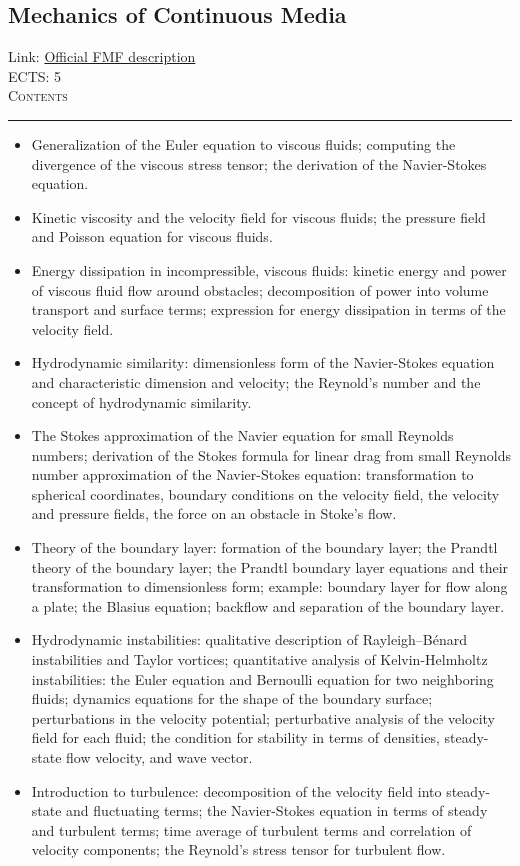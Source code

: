 \documentclass[11pt, a4paper]{article}
\newenvironment{course}[3]{
\subsection{#1}%
Link: \href{#2}{Official FMF description}\\%
ECTS: #3%
\vspace{1ex}
\\
{\large \textsc{Contents}}\\[-0.9ex]%
\rule{\textwidth}{0.5pt}
\vspace{-3ex}
}
{}
\newenvironment{chapter}[1]{
\begin{tcolorbox}[title=#1, breakable]
}
{\end{tcolorbox}}
\begin{document}
\begin{course}{Mechanics of Continuous Media}{https://www.fmf.uni-lj.si/en/study-physics/programmes/1fiz/2020/7000777/courses/1160/}{5}
\begin{chapter}{Mechanics of viscous fluids}
\begin{itemize}
            \item Generalization of the Euler equation to viscous fluids; computing the divergence of the viscous stress tensor; the derivation of the Navier-Stokes equation.

            \item Kinetic viscosity and the velocity field for viscous fluids; the pressure field and Poisson equation for viscous fluids.

            \item Energy dissipation in incompressible, viscous fluids: kinetic energy and power of viscous fluid flow around obstacles; decomposition of power into volume transport and surface terms; expression for energy dissipation in terms of the velocity field.

            \item Hydrodynamic similarity: dimensionless form of the Navier-Stokes equation and characteristic dimension and velocity; the Reynold's number and the concept of hydrodynamic similarity.

            \item The Stokes approximation of the Navier equation for small Reynolds numbers; derivation of the Stokes formula for linear drag from small Reynolds number approximation of the Navier-Stokes equation: transformation to spherical coordinates, boundary conditions on the velocity field, the velocity and pressure fields, the force on an obstacle in Stoke's flow.

            \item Theory of the boundary layer: formation of the boundary layer; the Prandtl theory of the boundary layer; the Prandtl boundary layer equations and their transformation to dimensionless form; example: boundary layer for flow along a plate; the Blasius equation; backflow and separation of the boundary layer.

            \item Hydrodynamic instabilities: qualitative description of Rayleigh–Bénard instabilities and Taylor vortices; quantitative analysis of Kelvin-Helmholtz instabilities: the Euler equation and Bernoulli equation for two neighboring fluids; dynamics equations for the shape of the boundary surface; perturbations in the velocity potential; perturbative analysis of the velocity field for each fluid; the condition for stability in terms of densities, steady-state flow velocity, and wave vector.

            \item Introduction to turbulence: decomposition of the velocity field into steady-state and fluctuating terms; the Navier-Stokes equation in terms of steady and turbulent terms; time average of turbulent terms and correlation of velocity components; the Reynold's stress tensor for turbulent flow.
        \end{itemize}
    \end{chapter}
\end{course}
\end{document}
